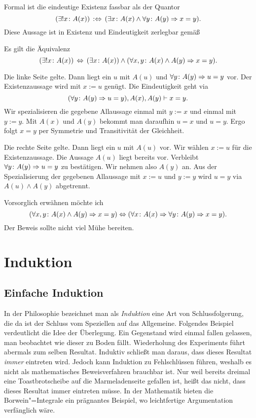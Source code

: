 Formal ist die eindeutige Existenz fassbar als der Quantor
\[(\exists! x\colon A(x))\,:\Leftrightarrow\,
(\exists x\colon A(x)\land\forall y\colon A(y)\Rightarrow x=y).\]
Diese Aussage ist in Existenz und Eindeutigkeit zerlegbar gemäß
\begin{Satz}\label{eindeutige-Existenz-separat}
Es gilt die Äquivalenz
\[(\exists! x\colon A(x))\,\Leftrightarrow\,
(\exists x\colon A(x))\land(\forall x,y\colon A(x)\land A(y)\Rightarrow x=y).\]
\end{Satz}
\begin{Beweis}
Die linke Seite gelte. Dann liegt ein $u$ mit $A(u)$
und $\forall y\colon A(y)\Rightarrow u=y$ vor. Der Existenzaussage wird
mit $x:=u$ genügt. Die Eindeutigkeit geht via
\[(\forall y\colon A(y)\Rightarrow u=y), A(x), A(y)\vdash x=y.\]
Wir spezialisieren die gegebene Allaussage einmal mit $y:=x$ und einmal
mit $y:=y$. Mit $A(x)$ und $A(y)$ bekommt man daraufhin $u=x$ und $u=y$. Ergo
folgt $x=y$ per Symmetrie und Transitivität der Gleichheit.

Die rechte Seite gelte. Dann liegt ein $u$ mit $A(u)$ vor. Wir wählen
$x:=u$ für die Existenzaussage. Die Aussage $A(u)$ liegt bereits vor.
Verbleibt $\forall y\colon A(y)\Rightarrow u=y$ zu bestätigen. Wir nehmen
also $A(y)$ an. Aus der Spezialisierung der gegebenen Allaussage mit
$x:=u$ und $y:=y$ wird $u=y$ via $A(u)\land A(y)$ abgetrennt.\,\qedsymbol
\end{Beweis}

\noindent
Vorsorglich erwähnen möchte ich
\[(\forall x,y\colon A(x)\land A(y)\Rightarrow x=y)\Leftrightarrow
(\forall x\colon A(x)\Rightarrow\forall y\colon A(y)\Rightarrow x = y).\]
Der Beweis sollte nicht viel Mühe bereiten.

\newpage
\section{Induktion}

\subsection{Einfache Induktion}

In der Philosophie bezeichnet man als \emph{Induktion} eine Art von
Schlussfolgerung, die da ist der Schluss vom Speziellen auf das
Allgemeine. Folgendes Beispiel verdeutlicht die Idee der Überlegung. Ein
Gegenstand wird einmal fallen gelassen, man beobachtet wie dieser zu
Boden fällt. Wiederholung des Experiments führt abermals zum selben
Resultat. Induktiv schließt man daraus, dass dieses Resultat \emph{immer}
eintreten wird. Jedoch kann Induktion zu Fehlschlüssen führen, weshalb
es nicht als mathematisches Beweisverfahren brauchbar ist. Nur weil
bereits dreimal eine Toastbrotscheibe auf die Marmeladenseite gefallen
ist, heißt das nicht, dass dieses Resultat immer eintreten müsse. In der
Mathematik bieten die Borwein"=Integrale ein prägnantes Beispiel, wo
leichtfertige Argumentation verfänglich wäre.

